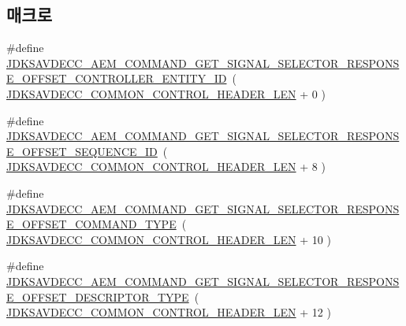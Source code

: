 \subsection*{매크로}
\begin{DoxyCompactItemize}
\item 
\#define \hyperlink{group__command__get__signal__selector__response_gadf4daa712b3e88bc83224eb040ebd1e4}{J\+D\+K\+S\+A\+V\+D\+E\+C\+C\+\_\+\+A\+E\+M\+\_\+\+C\+O\+M\+M\+A\+N\+D\+\_\+\+G\+E\+T\+\_\+\+S\+I\+G\+N\+A\+L\+\_\+\+S\+E\+L\+E\+C\+T\+O\+R\+\_\+\+R\+E\+S\+P\+O\+N\+S\+E\+\_\+\+O\+F\+F\+S\+E\+T\+\_\+\+C\+O\+N\+T\+R\+O\+L\+L\+E\+R\+\_\+\+E\+N\+T\+I\+T\+Y\+\_\+\+ID}~( \hyperlink{group__jdksavdecc__avtp__common__control__header_gaae84052886fb1bb42f3bc5f85b741dff}{J\+D\+K\+S\+A\+V\+D\+E\+C\+C\+\_\+\+C\+O\+M\+M\+O\+N\+\_\+\+C\+O\+N\+T\+R\+O\+L\+\_\+\+H\+E\+A\+D\+E\+R\+\_\+\+L\+EN} + 0 )
\item 
\#define \hyperlink{group__command__get__signal__selector__response_ga9a83fcd9a53a7f5d2d8864d12059b859}{J\+D\+K\+S\+A\+V\+D\+E\+C\+C\+\_\+\+A\+E\+M\+\_\+\+C\+O\+M\+M\+A\+N\+D\+\_\+\+G\+E\+T\+\_\+\+S\+I\+G\+N\+A\+L\+\_\+\+S\+E\+L\+E\+C\+T\+O\+R\+\_\+\+R\+E\+S\+P\+O\+N\+S\+E\+\_\+\+O\+F\+F\+S\+E\+T\+\_\+\+S\+E\+Q\+U\+E\+N\+C\+E\+\_\+\+ID}~( \hyperlink{group__jdksavdecc__avtp__common__control__header_gaae84052886fb1bb42f3bc5f85b741dff}{J\+D\+K\+S\+A\+V\+D\+E\+C\+C\+\_\+\+C\+O\+M\+M\+O\+N\+\_\+\+C\+O\+N\+T\+R\+O\+L\+\_\+\+H\+E\+A\+D\+E\+R\+\_\+\+L\+EN} + 8 )
\item 
\#define \hyperlink{group__command__get__signal__selector__response_gaf2385da4366372ac79597ab3e88e8494}{J\+D\+K\+S\+A\+V\+D\+E\+C\+C\+\_\+\+A\+E\+M\+\_\+\+C\+O\+M\+M\+A\+N\+D\+\_\+\+G\+E\+T\+\_\+\+S\+I\+G\+N\+A\+L\+\_\+\+S\+E\+L\+E\+C\+T\+O\+R\+\_\+\+R\+E\+S\+P\+O\+N\+S\+E\+\_\+\+O\+F\+F\+S\+E\+T\+\_\+\+C\+O\+M\+M\+A\+N\+D\+\_\+\+T\+Y\+PE}~( \hyperlink{group__jdksavdecc__avtp__common__control__header_gaae84052886fb1bb42f3bc5f85b741dff}{J\+D\+K\+S\+A\+V\+D\+E\+C\+C\+\_\+\+C\+O\+M\+M\+O\+N\+\_\+\+C\+O\+N\+T\+R\+O\+L\+\_\+\+H\+E\+A\+D\+E\+R\+\_\+\+L\+EN} + 10 )
\item 
\#define \hyperlink{group__command__get__signal__selector__response_ga40c716e630f9011ad02490f649bbc9cf}{J\+D\+K\+S\+A\+V\+D\+E\+C\+C\+\_\+\+A\+E\+M\+\_\+\+C\+O\+M\+M\+A\+N\+D\+\_\+\+G\+E\+T\+\_\+\+S\+I\+G\+N\+A\+L\+\_\+\+S\+E\+L\+E\+C\+T\+O\+R\+\_\+\+R\+E\+S\+P\+O\+N\+S\+E\+\_\+\+O\+F\+F\+S\+E\+T\+\_\+\+D\+E\+S\+C\+R\+I\+P\+T\+O\+R\+\_\+\+T\+Y\+PE}~( \hyperlink{group__jdksavdecc__avtp__common__control__header_gaae84052886fb1bb42f3bc5f85b741dff}{J\+D\+K\+S\+A\+V\+D\+E\+C\+C\+\_\+\+C\+O\+M\+M\+O\+N\+\_\+\+C\+O\+N\+T\+R\+O\+L\+\_\+\+H\+E\+A\+D\+E\+R\+\_\+\+L\+EN} + 12 )

\end{DoxyCompactItemize}
